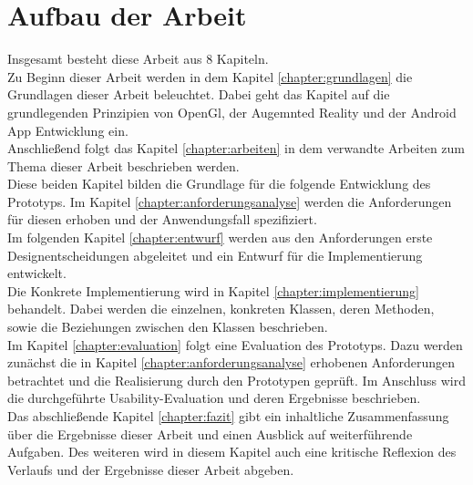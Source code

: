 \section{Aufbau der Arbeit}
Insgesamt besteht diese Arbeit aus 8 Kapiteln.\\
Zu Beginn dieser Arbeit werden in dem Kapitel \ref{chapter:grundlagen} die Grundlagen dieser Arbeit beleuchtet. Dabei geht das Kapitel auf die grundlegenden Prinzipien von OpenGl, der Augemnted Reality und der Android App Entwicklung ein.\\
Anschließend folgt das Kapitel \ref{chapter:arbeiten} in dem verwandte Arbeiten zum Thema dieser Arbeit beschrieben werden.\\
Diese beiden Kapitel bilden die Grundlage für die folgende Entwicklung des Prototyps. Im Kapitel \ref{chapter:anforderungsanalyse} werden die Anforderungen für diesen erhoben und der Anwendungsfall spezifiziert.\\
Im folgenden Kapitel \ref{chapter:entwurf} werden aus den Anforderungen erste Designentscheidungen abgeleitet und ein Entwurf für die Implementierung entwickelt.\\
Die Konkrete Implementierung wird in Kapitel \ref{chapter:implementierung} behandelt. Dabei werden die einzelnen, konkreten Klassen, deren Methoden, sowie die Beziehungen zwischen den Klassen beschrieben. \\
Im Kapitel \ref{chapter:evaluation} folgt eine Evaluation des Prototyps. Dazu werden zunächst die in Kapitel \ref{chapter:anforderungsanalyse} erhobenen Anforderungen betrachtet und die Realisierung durch den Prototypen geprüft. Im Anschluss wird die durchgeführte Usability-Evaluation und deren Ergebnisse beschrieben. \\
Das abschließende Kapitel \ref{chapter:fazit} gibt ein inhaltliche Zusammenfassung über die Ergebnisse dieser Arbeit und einen Ausblick auf weiterführende Aufgaben. Des weiteren wird in diesem Kapitel auch eine kritische Reflexion des Verlaufs und der Ergebnisse dieser Arbeit abgeben.


